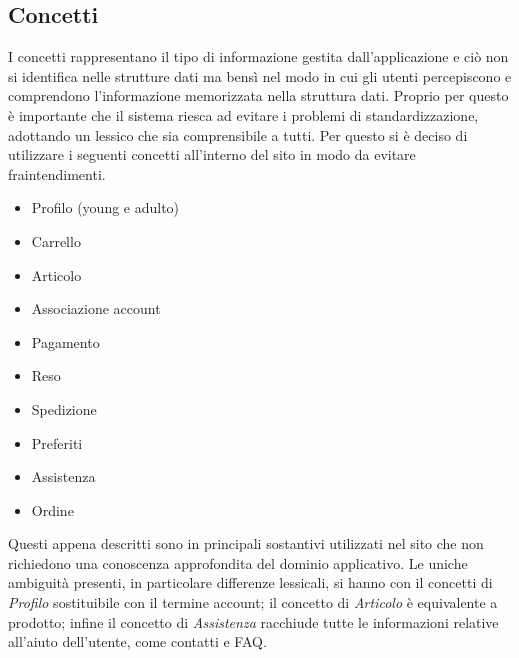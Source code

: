 \documentclass[12pt,a4paper]{report}
\begin{document}
\subsection{Concetti}
I concetti rappresentano il tipo di informazione gestita dall'applicazione e ciò non si identifica nelle strutture dati ma bensì nel modo in cui gli utenti percepiscono e comprendono l'informazione memorizzata nella struttura dati. Proprio per questo è importante che il sistema riesca ad evitare i problemi di standardizzazione, adottando un lessico che sia comprensibile a tutti. Per questo si è deciso di utilizzare i seguenti concetti all'interno del sito in modo da evitare fraintendimenti.
\begin{itemize}
  \item Profilo (young e adulto)
  \item Carrello
  \item Articolo
  \item Associazione account
  \item Pagamento
  \item Reso
  \item Spedizione
  \item Preferiti
  \item Assistenza
  \item Ordine
\end{itemize}
Questi appena descritti sono in principali sostantivi utilizzati nel sito che non richiedono una conoscenza approfondita del dominio applicativo. Le uniche ambiguità presenti, in particolare differenze lessicali, si hanno con il concetti di \textit{Profilo} sostituibile con il termine account; il concetto di \textit{Articolo} è equivalente a prodotto; infine il concetto di \textit{Assistenza} racchiude tutte le informazioni relative all'aiuto dell'utente, come contatti e FAQ.
\end{document}

